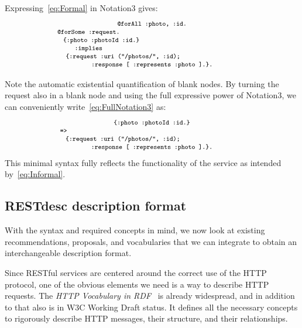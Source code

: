 \documentclass[runningheads,a4paper, twocolumn]{llncs}
\begin{document}
Expressing~\ref{eq:Formal} in Notation3 gives:
\begin{multline}\label{eq:FullNotation3}
    \makebox[2.7cm]{\fontsize{8}{10}\texttt{@forAll :photo, :id.}}\\[-.5em]
    \fontsize{8}{10}\texttt{@forSome :request.}\makebox[5.47cm]{}\\[-.5em]
    \fontsize{8}{10}\texttt{\{:photo :photoId :id.\}}\makebox[4.37cm]{}\\[-.5em]
    \fontsize{8}{10}\texttt{:implies}\makebox[5.47cm]{}\\[-.5em]
    \fontsize{8}{10}\texttt{\{:request :uri ("/photos/", :id);}\makebox[2.5cm]{}\\[-.5em]
    \makebox[5.75cm]{\fontsize{8}{10}\texttt{:response [ :represents :photo ].\}.}}
\end{multline}

Note the automatic existential quantification of blank nodes. By turning the request also in a blank node and using the full expressive power of Notation3, we can conveniently write~\ref{eq:FullNotation3} as:
\begin{multline}\label{eq:Notation3}
    \makebox[3.44cm]{\fontsize{8}{10}\texttt{\{:photo :photoId :id.\}}}\\[-.5em]
    \fontsize{8}{10}\texttt{=>}\makebox[7.6cm]{}\\[-.5em]
    \fontsize{8}{10}\texttt{\{:request :uri ("/photos/", :id);}\makebox[2.5cm]{}\\[-.5em]
    \makebox[5.75cm]{\fontsize{8}{10}\texttt{:response [ :represents :photo ].\}.}}
\end{multline}
This minimal syntax fully reflects the functionality of the service as intended by~\ref{eq:Informal}.

\subsection{RESTdesc description format}
With the syntax and required concepts in mind, we now look at existing recommendations, proposals, and vocabularies that we can integrate to obtain an interchangeable description format.

Since RESTful services are centered around the correct use of the HTTP protocol, one of the obvious elements we need is a way to describe HTTP requests. The \emph{HTTP Vocabulary in RDF}~\cite{HTTPinRDF} is already widespread, and in addition to that also is in W3C Working Draft status. It defines all the necessary concepts to rigorously describe HTTP messages, their structure, and their relationships.
\end{document}
